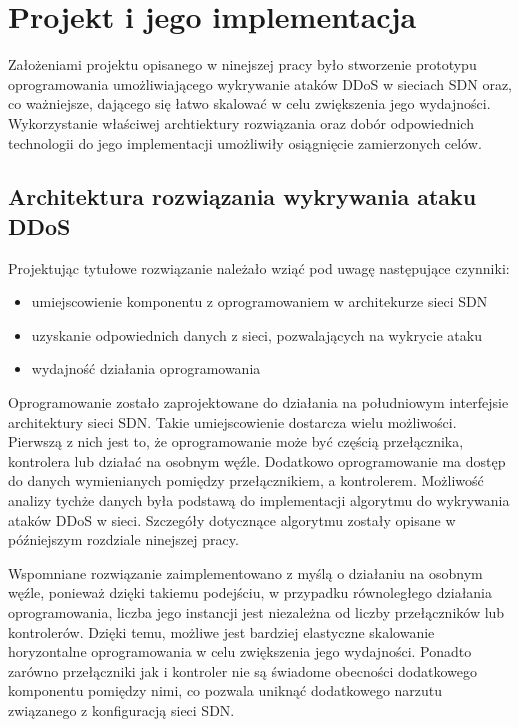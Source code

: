 \chapter{Projekt i jego implementacja}

Założeniami projektu opisanego w ninejszej pracy było stworzenie prototypu
oprogramowania umożliwiającego wykrywanie ataków DDoS w sieciach SDN oraz, co
ważniejsze, dającego się łatwo skalować w celu zwiększenia jego wydajności.
Wykorzystanie właściwej archtiektury rozwiązania oraz dobór odpowiednich
technologii do jego implementacji umożliwiły osiągnięcie zamierzonych celów.

\section{Architektura rozwiązania wykrywania ataku DDoS}

Projektując tytułowe rozwiązanie należało wziąć pod uwagę następujące czynniki:
\begin{itemize}
  \item umiejscowienie komponentu z oprogramowaniem w architekurze sieci SDN
  \item uzyskanie odpowiednich danych z sieci, pozwalających na wykrycie ataku
  \item wydajność działania oprogramowania
\end{itemize}

Oprogramowanie zostało zaprojektowane do działania na południowym interfejsie
architektury sieci SDN. Takie umiejscowienie dostarcza wielu możliwości.
Pierwszą z nich jest to, że oprogramowanie może być częścią przełącznika,
kontrolera lub działać na osobnym węźle. Dodatkowo oprogramowanie ma dostęp do
danych wymienianych pomiędzy przełącznikiem, a kontrolerem. Możliwość analizy
tychże danych była podstawą do implementacji algorytmu do wykrywania ataków DDoS
w sieci. Szczegóły dotycznące algorytmu zostały opisane w późniejszym rozdziale
ninejszej pracy. 

Wspomniane rozwiązanie zaimplementowano z myślą o działaniu na osobnym węźle,
ponieważ dzięki takiemu podejściu, w przypadku równoległego działania
oprogramowania, liczba jego instancji jest niezależna od liczby przełączników
lub kontrolerów. Dzięki temu, możliwe jest bardziej elastyczne skalowanie
horyzontalne oprogramowania w celu zwiększenia jego wydajności. Ponadto zarówno
przełączniki jak i kontroler nie są świadome obecności dodatkowego komponentu
pomiędzy nimi, co pozwala uniknąć dodatkowego narzutu związanego z konfiguracją
sieci SDN. 

